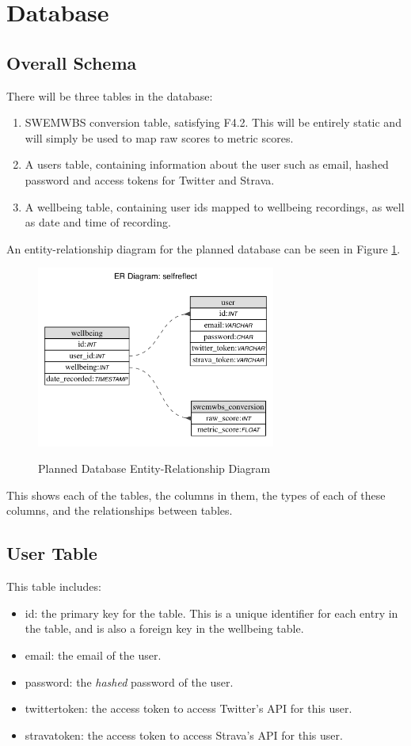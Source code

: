\documentclass[11pt,openright,a4paper]{report}
\begin{document}
\section{Database} \label{sec:databasedesign}
\subsection{Overall Schema}
There will be three tables in the database:
\begin{enumerate}
\item SWEMWBS conversion table, satisfying F4.2. This will be entirely static and will simply be used to map raw scores to metric scores.
\item A users table, containing information about the user such as email, hashed password and access tokens for Twitter and Strava.
\item A wellbeing table, containing user ids mapped to wellbeing recordings, as well as date and time of recording.
\end{enumerate}

An entity-relationship diagram for the planned database can be seen in Figure \ref{fig:dberd}.

\begin{figure}[ht]
\centering
\caption{Planned Database Entity-Relationship Diagram}
\includegraphics[width=0.7\textwidth]{i/selfreflectdb.png}
\label{fig:dberd}
\end{figure}

This shows each of the tables, the columns in them, the types of each of these columns, and the relationships between tables.

\subsection{User Table}
This table includes:
\begin{itemize}
\item id: the primary key for the table. This is a unique identifier for each entry in the table, and is also a foreign key in the wellbeing table.
\item email: the email of the user.
\item password: the \emph{hashed} password of the user.
\item twitter\textunderscore token: the access token to access Twitter's API for this user.
\item strava\textunderscore token: the access token to access Strava's API for this user.
\end{itemize}
\end{document}
